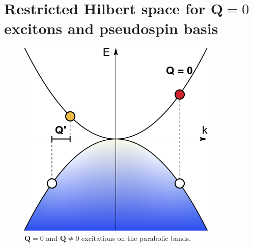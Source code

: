 \documentclass[english,aps,prd,nofootinbib,twocolumn]{revtex4-1}
\begin{document}
\section{Restricted Hilbert space for $\mathbf{Q}=0$ excitons and pseudospin basis}
\begin{figure}
\centering
\includegraphics[scale=0.45]{ParabolicVertical.png}
\caption{$\mathbf{Q}=0$ and $\mathbf{Q}\neq 0$ excitations on the parabolic bands.}
\label{fig:Q=0-excitons}
\end{figure}
\end{document}
